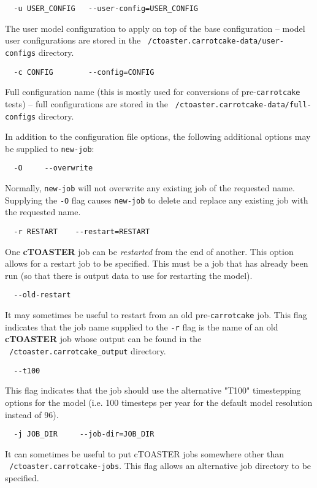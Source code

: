 \documentclass[a4paper,10pt,article]{memoir}
\begin{document}
\begin{verbatim}
  -u USER_CONFIG   --user-config=USER_CONFIG
\end{verbatim}
The user model configuration to apply on top of the base configuration
-- model user configurations are stored in the
\texttt{~/ctoaster.carrotcake-data/user-configs} directory.

\begin{verbatim}
  -c CONFIG        --config=CONFIG
\end{verbatim}
Full configuration name (this is mostly used for conversions of
pre-\texttt{carrotcake} tests) -- full configurations are stored in the
\texttt{~/ctoaster.carrotcake-data/full-configs} directory.

In addition to the configuration file options, the following
additional options may be supplied to \texttt{new-job}:

\begin{verbatim}
  -O     --overwrite
\end{verbatim}
Normally, \texttt{new-job} will not overwrite any existing job of the
requested name.  Supplying the \texttt{-O} flag causes
\texttt{new-job} to delete and replace any existing job with the
requested name.

\begin{verbatim}
  -r RESTART    --restart=RESTART
\end{verbatim}
One \textbf{cTOASTER} job can be \emph{restarted} from the end of another.  This
option allows for a restart job to be specified.  This must be a job
that has already been run (so that there is output data to use for
restarting the model).

\begin{verbatim}
  --old-restart
\end{verbatim}
It may sometimes be useful to restart from an old pre-\texttt{carrotcake}
job.  This flag indicates that the job name supplied to the
\texttt{-r} flag is the name of an old \textbf{cTOASTER} job whose output can be
found in the 
\\\texttt{~/ctoaster.carrotcake\_output} directory.

\begin{verbatim}
  --t100
\end{verbatim}
This flag indicates that the job should use the alternative "T100"
timestepping options for the model (i.e. 100 timesteps per year for
the default model resolution instead of 96).

\begin{verbatim}
  -j JOB_DIR     --job-dir=JOB_DIR
\end{verbatim}
It can sometimes be useful to put cTOASTER jobs somewhere other than
\texttt{~/ctoaster.carrotcake-jobs}.  This flag allows an alternative job directory
to be specified.
\end{document}
